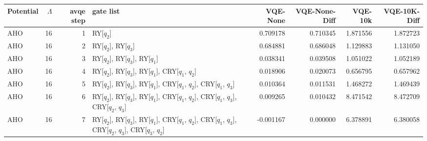 \begin{tabular}{lrrlrrrr}
\toprule
Potential & $\Lambda$ & avqe step & gate list & VQE-None & VQE-None-Diff & VQE-10k & VQE-10K-Diff \\
\midrule
AHO & 16 & 1 & RY[$q_2$] & 0.709178 & 0.710345 & 1.871556 & 1.872723 \\
AHO & 16 & 2 & RY[$q_2$], RY[$q_3$] & 0.684881 & 0.686048 & 1.129883 & 1.131050 \\
AHO & 16 & 3 & RY[$q_2$], RY[$q_3$], RY[$q_1$] & 0.038341 & 0.039508 & 1.051022 & 1.052189 \\
AHO & 16 & 4 & RY[$q_2$], RY[$q_3$], RY[$q_1$], CRY[$q_1$, $q_2$] & 0.018906 & 0.020073 & 0.656795 & 0.657962 \\
AHO & 16 & 5 & RY[$q_2$], RY[$q_3$], RY[$q_1$], CRY[$q_1$, $q_2$], CRY[$q_1$, $q_3$] & 0.010364 & 0.011531 & 1.468272 & 1.469439 \\
AHO & 16 & 6 & RY[$q_2$], RY[$q_3$], RY[$q_1$], CRY[$q_1$, $q_2$], CRY[$q_1$, $q_3$], CRY[$q_2$, $q_3$] & 0.009265 & 0.010432 & 8.471542 & 8.472709 \\
AHO & 16 & 7 & RY[$q_2$], RY[$q_3$], RY[$q_1$], CRY[$q_1$, $q_2$], CRY[$q_1$, $q_3$], CRY[$q_2$, $q_3$], CRY[$q_3$, $q_2$] & -0.001167 & 0.000000 & 6.378891 & 6.380058 \\
\bottomrule
\end{tabular}
